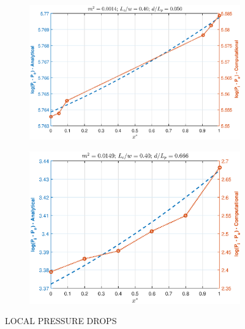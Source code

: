 \documentclass[twocolumn,10pt,cleanfoot]{ihmtc}
\begin{document}
\begin{figure}
\centering
   \begin{subfigure}[b]{0.55\textwidth}
   \includegraphics[height=0.55\linewidth,width=0.90\linewidth]{pres_a.eps}
   \caption{}
   \label{pres_a} 
\end{subfigure}
%
   \begin{subfigure}[b]{0.55\textwidth}
   \includegraphics[height=0.55\linewidth,width=0.90\linewidth]{pres_b.eps}
   \caption{}
   \label{pres_b} 
\end{subfigure}
%
%
%
\caption{LOCAL PRESSURE DROPS}
\vspace{-3em}
\end{figure}
%
%
\end{document}
